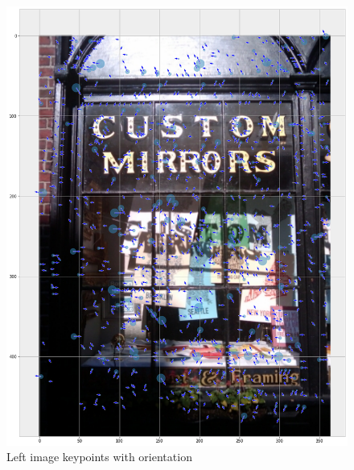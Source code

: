 \documentclass[]{article}
\begin{document}
\begin{figure}[htb]
	\centering
	\includegraphics[width=\linewidth]{CustomMirrorsLeftStep3}
	\caption{Left image keypoints with orientation}
	\label{custommirrorsleftstep3}
\end{figure}
\end{document}
